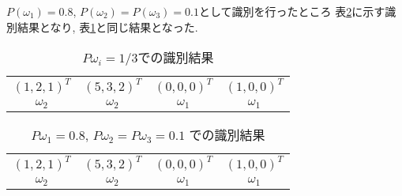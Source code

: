 $P(\omega_1)=0.8$, $P(\omega_2)=P(\omega_3)=0.1$として識別を行ったところ
表\ref{tbl:prob-discrimination-2}に示す識別結果となり, 
表\ref{tbl:prob-discrimination-1}と同じ結果となった. 

\begin{table}[htbp]
  \begin{tabular}{cccc}
    $(1, 2, 1)^T$ & $(5, 3, 2)^T$ & $(0, 0, 0)^T$ & $(1, 0, 0)^T$ \\
    $\omega_2$ & $\omega_2$ & $\omega_1$ & $\omega_1$
  \end{tabular}
  \caption{$P{\omega_i}=1/3$での識別結果}
  \label{tbl:prob-discrimination-1}
\end{table}

\begin{table}[htbp]
  \begin{tabular}{cccc}
    $(1, 2, 1)^T$ & $(5, 3, 2)^T$ & $(0, 0, 0)^T$ & $(1, 0, 0)^T$ \\
    $\omega_2$ & $\omega_2$ & $\omega_1$ & $\omega_1$
  \end{tabular}
  \caption{$P{\omega_1}=0.8$, $P{\omega_2}=P{\omega_3}=0.1$ での識別結果}
  \label{tbl:prob-discrimination-2}
\end{table}

